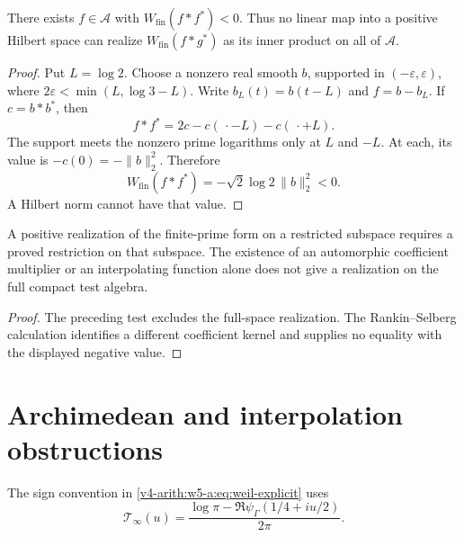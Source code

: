 \begin{theorem}
\label{v4-arith:w5-a:thm:prime-side}
There exists $f\in\mathscr A$ with $W_{\mathrm{fin}}(f*f^*)<0$.
Thus no linear map into a positive Hilbert space can realize
$W_{\mathrm{fin}}(f*g^*)$ as its inner product on all of $\mathscr A$.
\end{theorem}
\begin{proof}
Put $L=\log2$. Choose a nonzero real smooth $b$, supported in
$(-\varepsilon,\varepsilon)$, where
$2\varepsilon<\min(L,\log3-L)$. Write $b_L(t)=b(t-L)$ and
$f=b-b_L$. If $c=b*b^*$, then
\[
 f*f^*=2c-c(\,\cdot-L)-c(\,\cdot+L).
\]
The support meets the nonzero prime logarithms only at $L$ and
$-L$. At each, its value is $-c(0)=-\|b\|_2^2$. Therefore
\[
 W_{\mathrm{fin}}(f*f^*)=-\sqrt2\log2\,\|b\|_2^2<0.
\]
A Hilbert norm cannot have that value.
\end{proof}

\begin{corollary}
\label{v4-arith:w5-a:cor:HPLi-restricted}
A positive realization of the finite-prime form on a restricted
subspace requires a proved restriction on that subspace.
The existence of an automorphic coefficient multiplier or an
interpolating function alone does not give a realization on
the full compact test algebra.
\end{corollary}
\begin{proof}
The preceding test excludes the full-space realization.
The Rankin--Selberg calculation identifies a different coefficient
kernel and supplies no equality with the displayed negative value.
\end{proof}

\section{Archimedean and interpolation obstructions}
\label{v4-arith:w5-a:sec:obstruction}

\begin{definition}
\label{v4-arith:w5-a:def:tate-archimedean}
The sign convention in \eqref{v4-arith:w5-a:eq:weil-explicit} uses
\begin{equation}
 \mathcal T_\infty(u)=
 \frac{\log\pi-\Re\psi_\Gamma(1/4+iu/2)}{2\pi}.
 \label{v4-arith:w5-a:eq:tate-archimedean-distribution}
\end{equation}
\end{definition}

